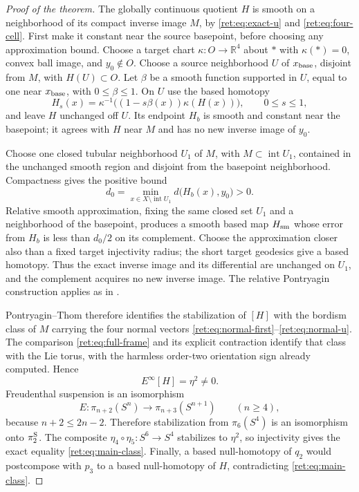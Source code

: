 \documentclass[11pt]{article}
\theoremstyle{definition}
\begin{document}
\begin{proof}[Proof of the theorem]
The globally continuous quotient \(H\) is smooth on a neighborhood
of its compact inverse image \(M\), by
\eqref{ret:eq:exact-u} and \eqref{ret:eq:four-cell}. First make it constant
near the source basepoint, before choosing any approximation bound.
Choose a target chart \(\kappa:O\to\mathbb R^4\) about \(*\) with
\(\kappa(*)=0\), convex ball image, and \(y_0\notin O\).
Choose a source neighborhood \(U\) of \(x_{\rm base}\), disjoint
from \(M\), with \(H(U)\subset O\). Let \(\beta\) be a smooth
function supported in \(U\), equal to one near \(x_{\rm base}\),
with \(0\leq\beta\leq1\). On \(U\) use the based homotopy
\[
 H_s(x)=\kappa^{-1}\bigl((1-s\beta(x))\kappa(H(x))\bigr),
 \qquad 0\leq s\leq1,
\]
and leave \(H\) unchanged off \(U\). Its endpoint \(H_b\) is
smooth and constant near the basepoint; it agrees with \(H\)
near \(M\) and has no new inverse image of \(y_0\).

Choose one closed tubular neighborhood \(U_1\) of \(M\), with
\(M\subset\operatorname{int}U_1\), contained in the unchanged
smooth region and disjoint from the basepoint neighborhood.
Compactness gives the positive bound
\[
 d_0=\min_{x\in X\setminus\operatorname{int}U_1}
             d\bigl(H_b(x),y_0\bigr)>0.
\]
Relative smooth approximation, fixing the same closed set \(U_1\)
and a neighborhood of the basepoint, produces a smooth based map
\(H_{\rm sm}\) whose error from \(H_b\) is less than \(d_0/2\)
on its complement. Choose the approximation closer also than a
fixed target injectivity radius; the short target geodesics give a
based homotopy. Thus the exact inverse image and its differential
are unchanged on \(U_1\), and the complement acquires no new
inverse image. The relative Pontryagin construction applies as in
\cite[\S7, Theorem B and Lemma 4, pp.~43, 48--50]{retbib:Milnor1965}.

Pontryagin--Thom therefore identifies the stabilization of
\([H]\) with the bordism class of \(M\) carrying the four normal
vectors \eqref{ret:eq:normal-first}--\eqref{ret:eq:normal-u}.  The comparison
\eqref{ret:eq:full-frame} and its explicit contraction identify that
class with the Lie torus, with the harmless order-two orientation
sign already computed.  Hence
\[
 E^\infty[H]=\eta^2\ne0.
\]
Freudenthal suspension is an isomorphism
\[
 E:\pi_{n+2}(S^n)\longrightarrow\pi_{n+3}(S^{n+1})
 \qquad(n\geq4),
\]
because \(n+2\leq2n-2\).  Therefore stabilization from
\(\pi_6(S^4)\) is an isomorphism onto \(\pi_2^{\rm S}\).
The composite \(\eta_4\circ\eta_5:S^6\to S^4\) stabilizes to
\(\eta^2\), so injectivity gives the exact equality
\eqref{ret:eq:main-class}.  Finally, a based null-homotopy of \(q_2\)
would postcompose with \(p_3\) to a based null-homotopy of \(H\),
contradicting \eqref{ret:eq:main-class}.
\end{proof}
\end{document}
